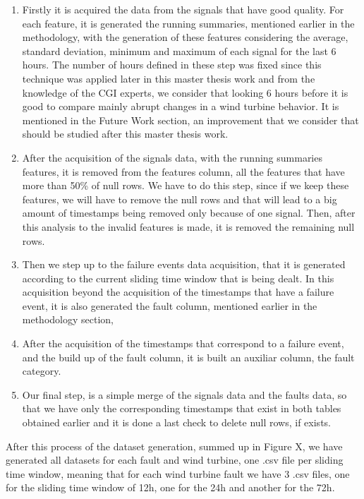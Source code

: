 \begin{enumerate}
    \item 
Firstly it is acquired the data from the signals that have good quality. For each feature, it is generated the running summaries, mentioned earlier in the methodology, with the generation of these features considering the average, standard deviation, minimum and maximum of each signal for the last 6 hours.
The number of hours defined in these step was fixed since this technique was applied later in this master thesis work and from the knowledge of the CGI experts, we consider that looking 6 hours before it is good to compare mainly abrupt changes in a wind turbine behavior.
It is mentioned in the Future Work section, an improvement that we consider that should be studied after this master thesis work.

    \item
After the acquisition of the signals data, with the running summaries features, it is removed from the features column, all the features that have more than 50\% of null rows. We have to do this step, since if we keep these features, we will have to remove the null rows and that will lead to a big amount of timestamps being removed only because of one signal.
Then, after this analysis to the invalid features is made, it is removed the remaining null rows.

    \item
Then we step up to the failure events data acquisition, that it is generated according to the current sliding time window that is being dealt. In this acquisition beyond the acquisition of the timestamps that have a failure event, it is also generated the fault column, mentioned earlier in the methodology section,

    \item
After the acquisition of the timestamps that correspond to a failure event, and the build up of the fault column, it is built an auxiliar column, the fault category.

    \item
Our final step, is a simple merge of the signals data and the faults data, so that we have only the corresponding timestamps that exist in both tables obtained earlier and it is done a last check to delete null rows, if exists.

\end{enumerate}

After this process of the dataset generation, summed up in Figure X, we have generated all datasets for each fault and wind turbine, one .csv file per sliding time window, meaning that for each wind turbine fault we have 3 .csv files, one for the sliding time window of 12h, one for the 24h and another for the 72h.


